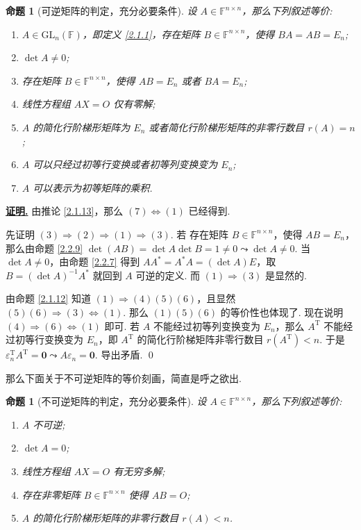 \documentclass[10pt,openany]{article}
\theoremstyle{thmstyle} %
\theoremstyle{defstyle} %
\theoremstyle{prostyle} %
\newtheorem{proposition}[theorem]{命题}
\theoremstyle{exastyle}
\theoremstyle{remstyle}
\renewenvironment{proof}[1][证明]{\par\underline{\textbf{#1.}} \;\fangsong}{\qed\par}
\newcommand{\T}{^{\text{T}}}
\newcommand{\F}{\mathbb{F}}
\newcommand{\gfn}{\text{GL}_n(\mathbb{F})}
\newcommand{\n}{^{n \times n}}
\begin{document}
\begin{proposition}[可逆矩阵的判定，充分必要条件]	\label{2.2.13}
	设 \( A \in \F\n \)，那么下列叙述等价:
	\begin{enumerate}[(1)]
		\item \( A \in \gfn \)，即定义 \ref{2.1.1}，存在矩阵 \( B \in \F\n \)，使得 \( BA=AB=E_n \);
		\item \( \det A \neq 0 \);
		\item 存在矩阵 \( B \in \F\n \)，使得 \( AB=E_n \) 或者 \( BA=E_n \);
		\item 线性方程组 \( AX=O \) 仅有零解;
		\item \( A \) 的简化行阶梯形矩阵为 \( E_n \) 或者简化行阶梯形矩阵的非零行数目 \( r(A)=n \);
		\item \( A \) 可以只经过初等行变换或者初等列变换变为 \( E_n \);
		\item \( A \) 可以表示为初等矩阵的乘积.
	\end{enumerate}

\end{proposition}

\begin{proof}
	由推论 \ref{2.1.13}，那么 \( (7) \Leftrightarrow (1) \) 已经得到.
	 
	先证明 \( (3) \Rightarrow (2) \Rightarrow (1) \Rightarrow (3) \). 若 存在矩阵 \( B \in \F\n \)，使得 \( AB=E_n \)，那么由命题 \ref{2.2.9} \( \det(AB)=\det A \det B=1 \neq 0 \leadsto \det A \neq 0 \). 当 \( \det A \neq 0 \)，由命题 \ref{2.2.7} 得到 \( AA^*=A^*A=(\det A) E \)，取 \( B=(\det A)^{-1}A^* \) 就回到 \( A \) 可逆的定义. 而 \( (1) \Rightarrow (3) \) 是显然的.
	
	由命题 \ref{2.1.12} 知道 \( (1)  \Rightarrow (4)(5)(6) \)，且显然 \( (5)(6) \Rightarrow (3) \Leftrightarrow (1) \). 那么 \( (1)(5)(6) \) 的等价性也体现了. 现在说明 \( (4) \Rightarrow (6) \Leftrightarrow (1) \) 即可. 若 \( A \) 不能经过初等列变换变为 \( E_n \)，那么 \( A\T \) 不能经过初等行变换变为 \( E_n \)，即 \( A\T \) 的简化行阶梯矩阵非零行数目 \( r(A\T) <n \). 于是 \( \varepsilon_n\T A\T=\bm{0} \leadsto A\varepsilon_n=\bm{0} \). 导出矛盾.
\end{proof}

那么下面关于不可逆矩阵的等价刻画，简直是呼之欲出.

\begin{proposition}[不可逆矩阵的判定，充分必要条件]	\label{2.2.14}
	设 \( A \in \F\n \)，那么下列叙述等价:
	\begin{enumerate}[(1)]
		\item \( A \) 不可逆;
		\item \( \det A = 0 \);
		\item 线性方程组 \( AX=O \) 有无穷多解;
		\item 存在非零矩阵 \( B \in \F\n \) 使得 \( AB=O \);
		\item \( A \) 的简化行阶梯形矩阵的非零行数目 \( r(A)<n \).
	\end{enumerate}

\end{proposition}
\end{document}
